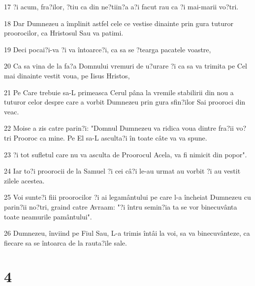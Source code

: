 \par 17 ?i acum, fra?ilor, ?tiu ca din ne?tiin?a a?i facut rau ca ?i mai-marii vo?tri.
\par 18 Dar Dumnezeu a împlinit astfel cele ce vestise dinainte prin gura tuturor proorocilor, ca Hristosul Sau va patimi.
\par 19 Deci pocai?i-va ?i va întoarce?i, ca sa se ?tearga pacatele voastre,
\par 20 Ca sa vina de la fa?a Domnului vremuri de u?urare ?i ca sa va trimita pe Cel mai dinainte vestit voua, pe Iisus Hristos,
\par 21 Pe Care trebuie sa-L primeasca Cerul pâna la vremile stabilirii din nou a tuturor celor despre care a vorbit Dumnezeu prin gura sfin?ilor Sai prooroci din veac.
\par 22 Moise a zis catre parin?i: "Domnul Dumnezeu va ridica voua dintre fra?ii vo?tri Prooroc ca mine. Pe El sa-L asculta?i în toate câte va va spune.
\par 23 ?i tot sufletul care nu va asculta de Proorocul Acela, va fi nimicit din popor".
\par 24 Iar to?i proorocii de la Samuel ?i cei câ?i le-au urmat au vorbit ?i au vestit zilele acestea.
\par 25 Voi sunte?i fiii proorocilor ?i ai legamântului pe care l-a încheiat Dumnezeu cu parin?ii no?tri, graind catre Avraam: "?i întru semin?ia ta se vor binecuvânta toate neamurile pamântului".
\par 26 Dumnezeu, înviind pe Fiul Sau, L-a trimis întâi la voi, sa va binecuvânteze, ca fiecare sa se întoarca de la rauta?ile sale.

\chapter{4}

